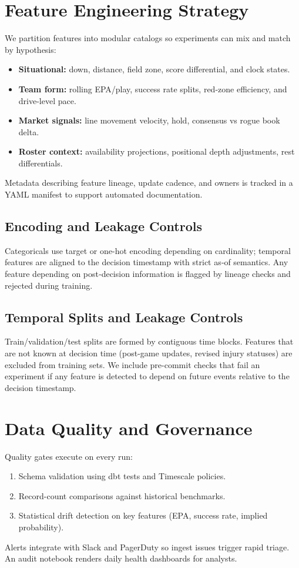 \section{Feature Engineering Strategy}
We partition features into modular catalogs so experiments can mix and match by hypothesis:
\begin{itemize}
  \item \textbf{Situational:} down, distance, field zone, score differential, and clock states.
  \item \textbf{Team form:} rolling EPA/play, success rate splits, red-zone efficiency, and drive-level pace.
  \item \textbf{Market signals:} line movement velocity, hold, consensus vs rogue book delta.
  \item \textbf{Roster context:} availability projections, positional depth adjustments, rest differentials.
\end{itemize}
Metadata describing feature lineage, update cadence, and owners is tracked in a YAML manifest to support automated documentation.

\subsection{Encoding and Leakage Controls}
Categoricals use target or one-hot encoding depending on cardinality; temporal features are aligned to the decision timestamp with strict as‑of semantics. Any feature depending on post‑decision information is flagged by lineage checks and rejected during training.

\subsection{Temporal Splits and Leakage Controls}
Train/validation/test splits are formed by contiguous time blocks. Features that are not known at decision time (post-game updates, revised injury statuses) are excluded from training sets. We include pre-commit checks that fail an experiment if any feature is detected to depend on future events relative to the decision timestamp.

\section{Data Quality and Governance}
Quality gates execute on every run:
\begin{enumerate}
  \item Schema validation using dbt tests and Timescale policies.
  \item Record-count comparisons against historical benchmarks.
  \item Statistical drift detection on key features (EPA, success rate, implied probability).
\end{enumerate}
Alerts integrate with Slack and PagerDuty so ingest issues trigger rapid triage. An audit notebook renders daily health dashboards for analysts.

